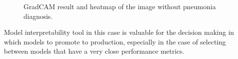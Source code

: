 \begin{figure}[H]%
    \centering
    \qquad
    \caption{GradCAM result and heatmap of the image without pneumonia diagnosis.}%
    \label{fig:camnormal}%
\end{figure}

Model interpretability tool in this case is valuable for the decision making in which models to promote to production, especially in the case of selecting between models that have a very close performance metrics.

